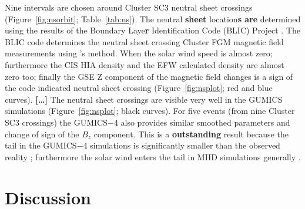 \documentclass[linenumbers,draft]{agujournal}
\begin{document}
Nine intervals are chosen around Cluster SC3 neutral sheet crossings (Figure~\ref{fig:nsorbit}; Table~\ref{tab:ns}). The neutral \textbf{sheet} location\textbf{s are} determined using the results of the Boundary Laye\textbf{r} Identification Code (BLIC) Project \citep{facskoon:_bow_clust}. The BLIC code determines the neutral sheet crossing Cluster FGM magnetic field measurements using \citet{wang94:_signat}'s method. When the solar wind speed is almost zero; furthermore the CIS HIA density and the EFW calculated density are almost zero too; finally the GSE Z component of the magnetic field changes is a sign of the code indicated neutral sheet crossing (Figure~\ref{fig:nsplot}; red and blue curves). \textbf{[\dots]} The neutral sheet crossings are visible very well in the GUMICS simulations (Figure~\ref{fig:nsplot}; black curves). For five events (from nine Cluster SC3 crossings) the GUMICS$-$4 also provides similar smoothed parameters and change of sign of the $B_{z}$ component. This is a \textbf{outstanding} result because the tail in the GUMICS$-$4 simulations is significantly smaller than the observed reality \citep{gordeev13:_verif_gumic_mhd,facsko16:_one_earth}; furthermore the solar wind enters the tail in MHD simulations generally \citep{kallio15:_proper}.

\section{Discussion}
\label{sec:discussion}
\end{document}
